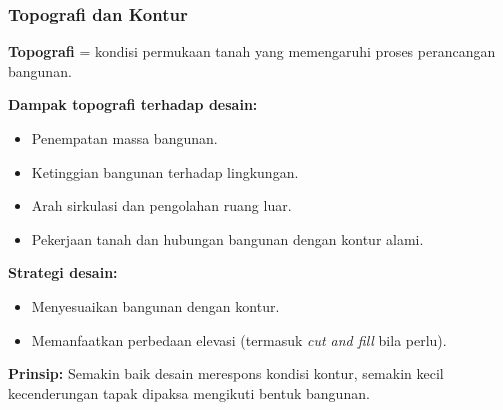 \documentclass[../main.tex]{subfiles}
\begin{document}
\begin{frame}[mytitle=standard, t, mycolor=digiPH_leaf, dark]
	\frametitle{Topografi dan Kontur}

	\textbf{Topografi} = kondisi permukaan tanah yang memengaruhi proses perancangan bangunan.

	\vspace{0.3cm}
	\textbf{Dampak topografi terhadap desain:}
	\begin{itemize}
		\item Penempatan massa bangunan.
		\item Ketinggian bangunan terhadap lingkungan.
		\item Arah sirkulasi dan pengolahan ruang luar.
		\item Pekerjaan tanah dan hubungan bangunan dengan kontur alami.
	\end{itemize}

	\textbf{Strategi desain:}
	\begin{itemize}
		\item Menyesuaikan bangunan dengan kontur.
		\item Memanfaatkan perbedaan elevasi (termasuk \textit{cut and fill} bila perlu).
	\end{itemize}

	\vspace{0.3cm}
	\textbf{Prinsip:} Semakin baik desain merespons kondisi kontur, semakin kecil kecenderungan tapak dipaksa mengikuti bentuk bangunan.
\end{frame}
\end{document}
